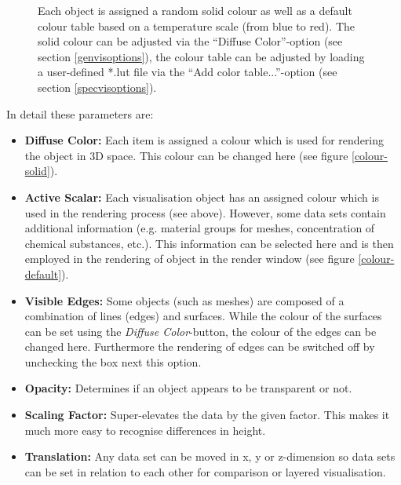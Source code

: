 \begin{figure}[tb]
\begin{center}
\enspace
{}\enspace
{}
\end{center}
\caption{Each object is assigned a random solid colour as well as a default colour table based on a temperature scale (from blue to red). The solid colour can be adjusted via the ``Diffuse Color''-option (see section \ref{genvisoptions}), the colour table can be adjusted by loading a user-defined *.lut file via the ``Add color table...''-option (see section \ref{specvisoptions}).} \label{fig:colours}
\end{figure}

In detail these parameters are:

\begin{itemize}
\item \textbf{Diffuse Color:} Each item is assigned a colour which is used for rendering the object in 3D space. This colour can be changed here (see figure \ref{colour-solid}).
\item \textbf{Active Scalar:} Each visualisation object has an assigned colour which is used in the rendering process (see above). However, some data sets contain additional information (e.g. material groups for meshes, concentration of chemical substances, etc.). This information can be selected here and is then employed in the rendering of object in the render window (see figure \ref{colour-default}).
\item \textbf{Visible Edges:} Some objects (such as meshes) are composed of a combination of lines (edges) and surfaces. While the colour of the surfaces can be set using the \emph{Diffuse Color}-button, the colour of the edges can be changed here. Furthermore the rendering of edges can be switched off by unchecking the box next this option.
\item \textbf{Opacity:} Determines if an object appears to be transparent or not.
\item \textbf{Scaling Factor:} Super-elevates the data by the given factor. This makes it much more easy to recognise differences in height.
\item \textbf{Translation:} Any data set can be moved in x, y or z-dimension so data sets can be set in relation to each other for comparison or layered visualisation.
\end{itemize}

